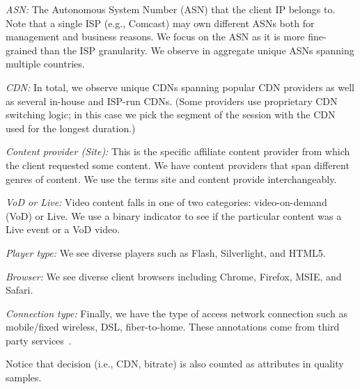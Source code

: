 \begin{packedenumerate}
\item \emph{ASN:} The Autonomous System Number (ASN) that the client IP belongs
 to. Note that a single ISP (e.g., Comcast) may own different ASNs both
 for management and business reasons. We focus on the ASN as it is more fine-grained
 than the ISP granularity.  We observe in aggregate \fillme unique ASNs
  spanning multiple countries.

\item \emph{CDN:}   In total, we observe
\fillme unique CDNs spanning popular CDN providers as well as several in-house and
ISP-run CDNs. (Some providers use proprietary CDN switching logic; in
this case we pick the segment of the session with the CDN used for the longest
duration.)

\item \emph{Content provider (Site):} This is the specific affiliate content
provider from which the client requested some content. We have  \fillme content
providers that span different genres of content.  We use the terms site and
content provide interchangeably.

\item \emph{VoD or Live:} Video  content  falls in one
 of two categories: video-on-demand (VoD) or Live.  We use a binary indicator to
 see if the particular content was a Live event or a VoD video.

\item \emph{Player type:} We see diverse  players such as  Flash, Silverlight,
and HTML5.

\item \emph{Browser:} We see diverse client browsers including Chrome, Firefox,
MSIE, and Safari.

\item \emph{Connection type:} Finally, we  have the type of
access network connection such  as
 mobile/fixed wireless, DSL, fiber-to-home. These annotations come from third party services~\cite{quova}.

Notice that decision (i.e., CDN, bitrate) is also counted as attributes in quality samples.

\end{packedenumerate}

